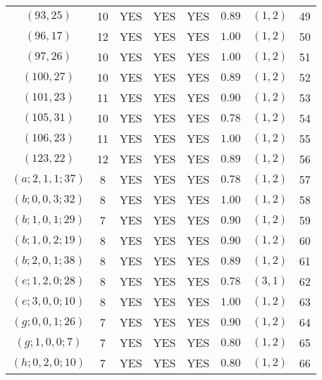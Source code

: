 \begin{longtable}{|c|c|c|c|c|c|c|c|}
$(93,25)$ & 10 & YES & YES & YES & $0.89$ & $(1,2)$ & 49\\
$(96,17)$ & 12 & YES & YES & YES & $1.00$ & $(1,2)$ & 50\\
$(97,26)$ & 10 & YES & YES & YES & $1.00$ & $(1,2)$ & 51\\
$(100,27)$ & 10 & YES & YES & YES & $0.89$ & $(1,2)$ & 52\\
$(101,23)$ & 11 & YES & YES & YES & $0.90$ & $(1,2)$ & 53\\
$(105,31)$ & 10 & YES & YES & YES & $0.78$ & $(1,2)$ & 54\\
$(106,23)$ & 11 & YES & YES & YES & $1.00$ & $(1,2)$ & 55\\
$(123,22)$ & 12 & YES & YES & YES & $0.89$ & $(1,2)$ & 56\\
$(a;2,1,1;37)$ & 8 & YES & YES & YES & $0.78$ & $(1,2)$ & 57\\
$(b;0,0,3;32)$ & 8 & YES & YES & YES & $1.00$ & $(1,2)$ & 58\\
$(b;1,0,1;29)$ & 7 & YES & YES & YES & $0.90$ & $(1,2)$ & 59\\
$(b;1,0,2;19)$ & 8 & YES & YES & YES & $0.90$ & $(1,2)$ & 60\\
$(b;2,0,1;38)$ & 8 & YES & YES & YES & $0.89$ & $(1,2)$ & 61\\
$(e;1,2,0;28)$ & 8 & YES & YES & YES & $0.78$ & $(3,1)$ & 62\\
$(e;3,0,0;10)$ & 8 & YES & YES & YES & $1.00$ & $(1,2)$ & 63\\
$(g;0,0,1;26)$ & 7 & YES & YES & YES & $0.90$ & $(1,2)$ & 64\\
$(g;1,0,0;7)$ & 7 & YES & YES & YES & $0.80$ & $(1,2)$ & 65\\
$(h;0,2,0;10)$ & 7 & YES & YES & YES & $0.80$ & $(1,2)$ & 66
\end{longtable}
